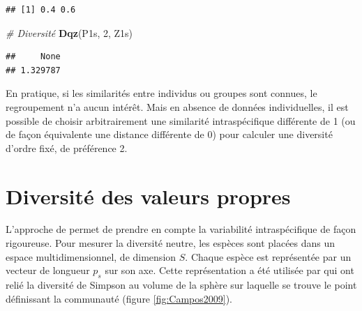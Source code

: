 \documentclass[
  11pt,
  french,
  a4paper,
  extrafontsizes,onecolumn,openright
  ]{memoir}
\newenvironment{Shaded}{\begin{snugshade}}{\end{snugshade}}
\newcommand{\CommentTok}[1]{\textcolor[rgb]{0.56,0.35,0.01}{\textit{#1}}}
\newcommand{\DecValTok}[1]{\textcolor[rgb]{0.00,0.00,0.81}{#1}}
\newcommand{\KeywordTok}[1]{\textcolor[rgb]{0.13,0.29,0.53}{\textbf{#1}}}
\newcommand{\NormalTok}[1]{#1}
\begin{document}
\begin{verbatim}
## [1] 0.4 0.6
\end{verbatim}

\begin{Shaded}
\begin{Highlighting}[]
\CommentTok{# Diversité}
\KeywordTok{Dqz}\NormalTok{(P1s, }\DecValTok{2}\NormalTok{, Z1s)}
\end{Highlighting}
\end{Shaded}

\begin{verbatim}
##     None 
## 1.329787
\end{verbatim}

\normalsize

En pratique, si les similarités entre individus ou groupes sont connues, le regroupement n'a aucun intérêt.
Mais en absence de données individuelles, il est possible de choisir arbitrairement une similarité intraspécifique différente de 1 (ou de façon équivalente une distance différente de 0) pour calculer une diversité d'ordre fixé, de préférence 2.

\hypertarget{diversituxe9-des-valeurs-propres}{%
\section{Diversité des valeurs propres}\label{diversituxe9-des-valeurs-propres}}

L'approche de \textcite{Pavoine2014} permet de prendre en compte la variabilité intraspécifique de façon rigoureuse.
Pour mesurer la diversité neutre, les espèces sont placées dans un espace multidimensionnel, de dimension \(S\).
Chaque espèce est représentée par un vecteur de longueur \(p_s\) sur son axe.
Cette représentation a été utilisée par \textcite{Campos2009} qui ont relié la diversité de Simpson au volume de la sphère sur laquelle se trouve le point définissant la communauté (figure \ref{fig:Campos2009}).



\scriptsize
\end{document}
